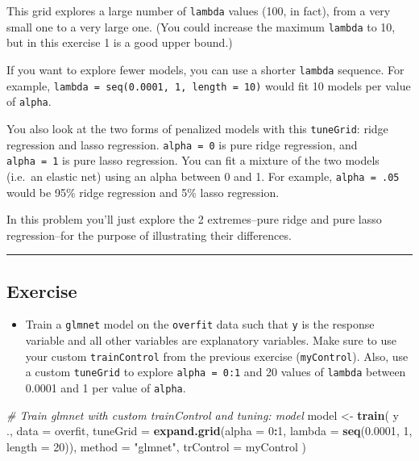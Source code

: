 \documentclass[]{book}
\newenvironment{Shaded}{\begin{snugshade}}{\end{snugshade}}
\newcommand{\KeywordTok}[1]{\textcolor[rgb]{0.13,0.29,0.53}{\textbf{#1}}}
\newcommand{\DataTypeTok}[1]{\textcolor[rgb]{0.13,0.29,0.53}{#1}}
\newcommand{\DecValTok}[1]{\textcolor[rgb]{0.00,0.00,0.81}{#1}}
\newcommand{\FloatTok}[1]{\textcolor[rgb]{0.00,0.00,0.81}{#1}}
\newcommand{\StringTok}[1]{\textcolor[rgb]{0.31,0.60,0.02}{#1}}
\newcommand{\CommentTok}[1]{\textcolor[rgb]{0.56,0.35,0.01}{\textit{#1}}}
\newcommand{\OperatorTok}[1]{\textcolor[rgb]{0.81,0.36,0.00}{\textbf{#1}}}
\newcommand{\NormalTok}[1]{#1}
\providecommand{\tightlist}{%
  \setlength{\itemsep}{0pt}\setlength{\parskip}{0pt}}
\begin{document}
This grid explores a large number of \texttt{lambda} values (100, in
fact), from a very small one to a very large one. (You could increase
the maximum \texttt{lambda} to 10, but in this exercise 1 is a good
upper bound.)

If you want to explore fewer models, you can use a shorter
\texttt{lambda} sequence. For example,
\texttt{lambda\ =\ seq(0.0001,\ 1,\ length\ =\ 10)} would fit 10 models
per value of \texttt{alpha}.

You also look at the two forms of penalized models with this
\texttt{tuneGrid}: ridge regression and lasso regression.
\texttt{alpha\ =\ 0} is pure ridge regression, and \texttt{alpha\ =\ 1}
is pure lasso regression. You can fit a mixture of the two models
(i.e.~an elastic net) using an alpha between 0 and 1. For example,
\texttt{alpha\ =\ .05} would be 95\% ridge regression and 5\% lasso
regression.

In this problem you'll just explore the 2 extremes--pure ridge and pure
lasso regression--for the purpose of illustrating their differences.

\begin{center}\rule{0.5\linewidth}{\linethickness}\end{center}

\subsection*{Exercise}\label{exercise-22}

\begin{itemize}
\tightlist
\item
  Train a \texttt{glmnet} model on the \texttt{overfit} data such that
  \texttt{y} is the response variable and all other variables are
  explanatory variables. Make sure to use your custom
  \texttt{trainControl} from the previous exercise (\texttt{myControl}).
  Also, use a custom \texttt{tuneGrid} to explore \texttt{alpha\ =\ 0:1}
  and 20 values of \texttt{lambda} between 0.0001 and 1 per value of
  \texttt{alpha}.
\end{itemize}

\begin{Shaded}
\begin{Highlighting}[]
\CommentTok{# Train glmnet with custom trainControl and tuning: model}
\NormalTok{model <-}\StringTok{ }\KeywordTok{train}\NormalTok{(}
\NormalTok{  y }\OperatorTok{~}\StringTok{ }\NormalTok{., }\DataTypeTok{data =}\NormalTok{ overfit,}
  \DataTypeTok{tuneGrid =} \KeywordTok{expand.grid}\NormalTok{(}\DataTypeTok{alpha  =} \DecValTok{0}\OperatorTok{:}\DecValTok{1}\NormalTok{, }
                         \DataTypeTok{lambda =} \KeywordTok{seq}\NormalTok{(}\FloatTok{0.0001}\NormalTok{, }\DecValTok{1}\NormalTok{, }\DataTypeTok{length =} \DecValTok{20}\NormalTok{)),}
  \DataTypeTok{method =} \StringTok{"glmnet"}\NormalTok{,}
  \DataTypeTok{trControl =}\NormalTok{ myControl}
\NormalTok{)}
\end{Highlighting}
\end{Shaded}
\end{document}
